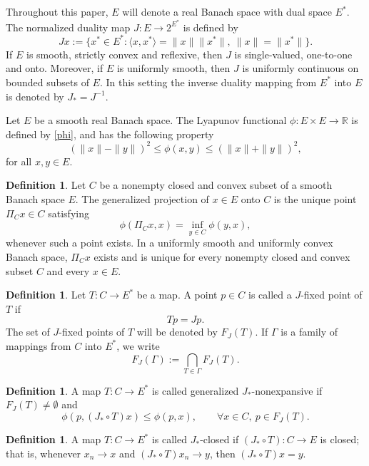 \documentclass[leqno,12pt]{amsart}
\theoremstyle{definition}
\newtheorem{definition}[theorem]{Definition}
\numberwithin{equation}{section}
\begin{document}
Throughout this paper, $E$ will denote a real Banach space with dual space $E^{*}$. The normalized duality map $J:E\to 2^{E^{*}}$ is defined by
\[
Jx:=\{x^{*}\in E^{*}:\langle x,x^{*}\rangle=\|x\|\|x^{*}\|,\ \|x\|=\|x^{*}\|\}.
\]
If $E$ is smooth, strictly convex and reflexive, then $J$ is single-valued, one-to-one and onto. Moreover, if $E$ is uniformly smooth, then $J$ is uniformly continuous on bounded subsets of $E$. In this setting the inverse duality mapping from $E^{*}$ into $E$ is denoted by $J_{*}=J^{-1}$.

Let $E$ be a smooth real Banach space. The Lyapunov functional $\phi:E\times E\to \mathbb{R}$ is defined by \eqref{phi}, and has the following property
\begin{equation}\label{phibounds}
(\|x\|-\|y\|)^2\leq \phi(x,y)\leq (\|x\|+\|y\|)^2,
\end{equation}
for all $x,y\in E$.

\begin{definition}\label{gprojdef}
Let $C$ be a nonempty closed and convex subset of a smooth Banach space $E$. The generalized projection of $x\in E$ onto $C$ is the unique point $\Pi_Cx\in C$ satisfying
\[
\phi(\Pi_Cx,x)=\inf_{y\in C}\phi(y,x),
\]
whenever such a point exists. In a uniformly smooth and uniformly convex Banach space, $\Pi_Cx$ exists and is unique for every nonempty closed and convex subset $C$ and every $x\in E$.
\end{definition}

\begin{definition}\label{Jfixeddef}
Let $T:C\to E^{*}$ be a map. A point $p\in C$ is called a $J$-fixed point of $T$ if
\[
Tp=Jp.
\]
The set of $J$-fixed points of $T$ will be denoted by $F_J(T)$. If $\Gamma$ is a family of mappings from $C$ into $E^{*}$, we write
\[
F_J(\Gamma):=\bigcap_{T\in\Gamma}F_J(T).
\]
\end{definition}

\begin{definition}\label{GenJstar}
A map $T:C\to E^{*}$ is called generalized $J_{*}$-nonexpansive if $F_J(T)\neq\emptyset$ and
\[
\phi(p,(J_{*}\circ T)x)\leq \phi(p,x),\qquad \forall x\in C,\ p\in F_J(T).
\]
\end{definition}

\begin{definition}\label{Jcloseddef}
A map $T:C\to E^{*}$ is called $J_{*}$-closed if $(J_{*}\circ T):C\to E$ is closed; that is, whenever $x_n\to x$ and $(J_{*}\circ T)x_n\to y$, then $(J_{*}\circ T)x=y$.
\end{definition}
\end{document}
